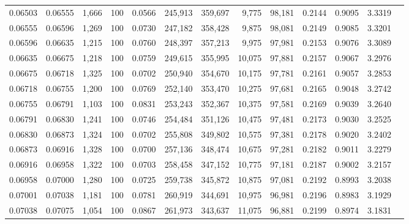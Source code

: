 \begin{tabular}{rrrrrrrrrrrrr}
0.06503 & 0.06555 & 1,666 & 100 &                                     0.0566 & 245,913 & 359,697 &   9,775 &  98,181 & 0.2144 & 0.9095 & 3.3319 \\
0.06555 & 0.06596 & 1,269 & 100 &                                     0.0730 & 247,182 & 358,428 &   9,875 &  98,081 & 0.2149 & 0.9085 & 3.3201 \\
0.06596 & 0.06635 & 1,215 & 100 &                                     0.0760 & 248,397 & 357,213 &   9,975 &  97,981 & 0.2153 & 0.9076 & 3.3089 \\
0.06635 & 0.06675 & 1,218 & 100 &                                     0.0759 & 249,615 & 355,995 &  10,075 &  97,881 & 0.2157 & 0.9067 & 3.2976 \\
0.06675 & 0.06718 & 1,325 & 100 &                                     0.0702 & 250,940 & 354,670 &  10,175 &  97,781 & 0.2161 & 0.9057 & 3.2853 \\
0.06718 & 0.06755 & 1,200 & 100 &                                     0.0769 & 252,140 & 353,470 &  10,275 &  97,681 & 0.2165 & 0.9048 & 3.2742 \\
0.06755 & 0.06791 & 1,103 & 100 &                                     0.0831 & 253,243 & 352,367 &  10,375 &  97,581 & 0.2169 & 0.9039 & 3.2640 \\
0.06791 & 0.06830 & 1,241 & 100 &                                     0.0746 & 254,484 & 351,126 &  10,475 &  97,481 & 0.2173 & 0.9030 & 3.2525 \\
0.06830 & 0.06873 & 1,324 & 100 &                                     0.0702 & 255,808 & 349,802 &  10,575 &  97,381 & 0.2178 & 0.9020 & 3.2402 \\
0.06873 & 0.06916 & 1,328 & 100 &                                     0.0700 & 257,136 & 348,474 &  10,675 &  97,281 & 0.2182 & 0.9011 & 3.2279 \\
0.06916 & 0.06958 & 1,322 & 100 &                                     0.0703 & 258,458 & 347,152 &  10,775 &  97,181 & 0.2187 & 0.9002 & 3.2157 \\
0.06958 & 0.07000 & 1,280 & 100 &                                     0.0725 & 259,738 & 345,872 &  10,875 &  97,081 & 0.2192 & 0.8993 & 3.2038 \\
0.07001 & 0.07038 & 1,181 & 100 &                                     0.0781 & 260,919 & 344,691 &  10,975 &  96,981 & 0.2196 & 0.8983 & 3.1929 \\
0.07038 & 0.07075 & 1,054 & 100 &                                     0.0867 & 261,973 & 343,637 &  11,075 &  96,881 & 0.2199 & 0.8974 & 3.1831 \\

\end{tabular}
